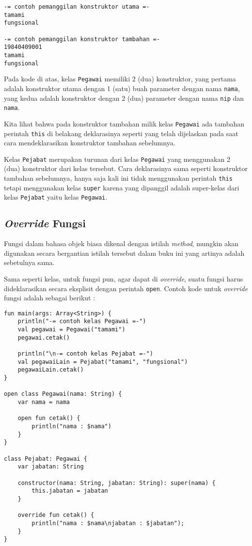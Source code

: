 \begin{lstlisting}
-= contoh pemanggilan konstruktor utama =-
tamami
fungsional

-= contoh pemanggilan konstruktor tambahan =- 
19840409001
tamami
fungsional
\end{lstlisting}

Pada kode di atas, kelas \texttt{Pegawai} memiliki 2 (dua) konstruktor, yang pertama adalah konstruktor utama dengan 1 (satu) buah parameter dengan nama \texttt{nama}, yang kedua adalah konstruktor dengan 2 (dua) parameter dengan nama \texttt{nip} dan \texttt{nama}.

Kita lihat bahwa pada konstruktor tambahan milik kelas \texttt{Pegawai} ada tambahan perintah \texttt{this} di belakang deklarasinya seperti yang telah dijelaskan pada saat cara mendeklarasikan konstruktor tambahan sebelumnya.

Kelas \texttt{Pejabat} merupakan turunan dari kelas \texttt{Pegawai} yang menggunakan 2 (dua) konstruktor dari kelas tersebut. Cara deklarasinya sama seperti konstruktor tambahan sebelumnya, hanya saja kali ini tidak menggunakan perintah \texttt{this} tetapi menggunakan kelas \texttt{super} karena yang dipanggil adalah super-kelas dari kelas \texttt{Pejabat} yaitu kelas \texttt{Pegawai}.

\subsection{\textit{Override} Fungsi}

Fungsi dalam bahasa objek biasa dikenal dengan istilah \textit{method}, mungkin akan digunakan secara bergantian istilah tersebut dalam buku ini yang artinya adalah sebetulnya sama.

Sama seperti kelas, untuk fungsi pun, agar dapat di \textit{override}, suatu fungsi harus dideklarasikan secara eksplisit dengan perintah \texttt{open}. Contoh kode untuk \textit{override} fungsi adalah sebagai berikut :

\begin{lstlisting}
fun main(args: Array<String>) {
	println("-= contoh kelas Pegawai =-")
	val pegawai = Pegawai("tamami")
	pegawai.cetak()
	
	println("\n-= contoh kelas Pejabat =-")
	val pegawaiLain = Pejabat("tamami", "fungsional")
	pegawaiLain.cetak()
}

open class Pegawai(nama: String) {
	var nama = nama
	
	open fun cetak() {
		println("nama : $nama")
	}
}

class Pejabat: Pegawai {
	var jabatan: String
	
	constructor(nama: String, jabatan: String): super(nama) {
		this.jabatan = jabatan
	}
	
	override fun cetak() {
		println("nama : $nama\njabatan : $jabatan");
	}
}
\end{lstlisting}

